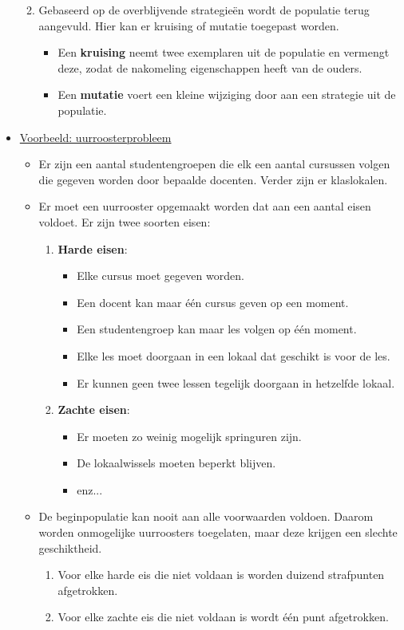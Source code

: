 \begin{itemize}
\begin{enumerate}
\begin{itemize}
		\end{itemize}
		\item Gebaseerd op de overblijvende strategieën wordt de populatie terug aangevuld. Hier kan er kruising of mutatie toegepast worden. 
		\begin{itemize}
			\item Een \textbf{kruising} neemt twee exemplaren uit de populatie en vermengt deze, zodat de nakomeling eigenschappen heeft van de ouders.
			\item Een \textbf{mutatie} voert een kleine wijziging door aan een strategie uit de populatie.
		\end{itemize}
	\end{enumerate}
	\item \underline{Voorbeeld: uurroosterprobleem}
	\begin{itemize}
		\item Er zijn een aantal studentengroepen die elk een aantal cursussen volgen die gegeven worden door bepaalde docenten. Verder zijn er klaslokalen.
		\item Er moet een uurrooster opgemaakt worden dat aan een aantal eisen voldoet. Er zijn twee soorten eisen:
		\begin{enumerate}
			\item \textbf{Harde eisen}: \begin{itemize}
				\item Elke cursus moet gegeven worden.
				\item Een docent kan maar één cursus geven op een moment.
				\item Een studentengroep kan maar les volgen op één moment.
				\item Elke les moet doorgaan in een lokaal dat geschikt is voor de les.
				\item Er kunnen geen twee lessen tegelijk doorgaan in hetzelfde lokaal.
			\end{itemize}
			\item \textbf{Zachte eisen}:
			\begin{itemize}
				\item Er moeten zo weinig mogelijk springuren zijn.
				\item De lokaalwissels moeten beperkt blijven.
				\item enz...
			\end{itemize}
		\end{enumerate}
		\item De beginpopulatie kan nooit aan alle voorwaarden voldoen. Daarom worden onmogelijke uurroosters toegelaten, maar deze krijgen een slechte geschiktheid. 
		\begin{enumerate}
			\item Voor elke harde eis die niet voldaan is worden duizend strafpunten afgetrokken.
			\item Voor elke zachte eis die niet voldaan is wordt één punt afgetrokken.
		\end{enumerate}

	\end{itemize}
\end{itemize}

